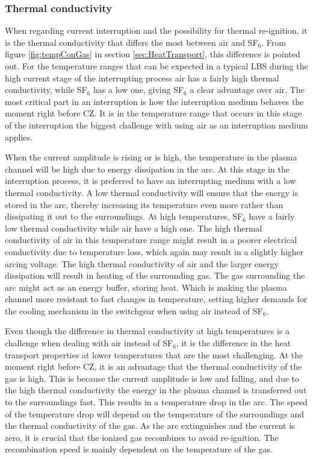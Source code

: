 \documentclass[10pt,a4paper,twoside]{article}
\begin{document}
\subsubsection*{Thermal conductivity}
When regarding current interruption and the possibility for thermal re-ignition, it is the thermal conductivity that differs the most between air and SF$_{6}$. From figure \ref{fig:tempConGas} in section \ref{sec:HeatTransport}, this difference is pointed out. For the temperature ranges that can be expected in a typical LBS during the high current stage of the interrupting process air has a fairly high thermal conductivity, while SF$_6$ has a low one, giving SF$_6$ a clear advantage over air. The most critical part in an interruption is how the interruption medium behaves the moment right before CZ. It is in the temperature range that occurs in this stage of the interruption the biggest challenge with using air as an interruption medium applies.

When the current amplitude is rising or is high, the temperature in the plasma channel will be high due to energy dissipation in the arc. At this stage in the interruption process, it is preferred to have an interrupting medium with a low thermal conductivity. A low thermal conductivity will ensure that the energy is stored in the arc, thereby increasing its temperature even more rather than dissipating it out to the surroundings. At high temperatures, SF$_6$ have a fairly low thermal conductivity while air have a high one. The high thermal conductivity of air in this temperature range might result in a poorer electrical conductivity due to temperature loss, which again may result in a slightly higher arcing voltage. The high thermal conductivity of air and the larger energy dissipation will result in heating of the surrounding gas. The gas surrounding the arc might act as an energy buffer, storing heat. Which is making the plasma channel more resistant to fast changes in temperature, setting higher demands for the cooling mechanism in the switchgear when using air instead of SF$_6$.

Even though the difference in thermal conductivity at high temperatures is a challenge when dealing with air instead of SF$_6$, it is the difference in the heat transport properties at lower temperatures that are the most challenging. At the moment right before CZ, it is an advantage that the thermal conductivity of the gas is high. This is because the current amplitude is low and falling, and due to the high thermal conductivity the energy in the plasma channel is transferred out to the surroundings fast. This results in a temperature drop in the arc. The speed of the temperature drop will depend on the temperature of the surroundings and the thermal conductivity of the gas. As the arc extinguishes and the current is zero, it is crucial that the ionized gas recombines to avoid re-ignition. The recombination speed is mainly dependent on the temperature of the gas. 
\end{document}
